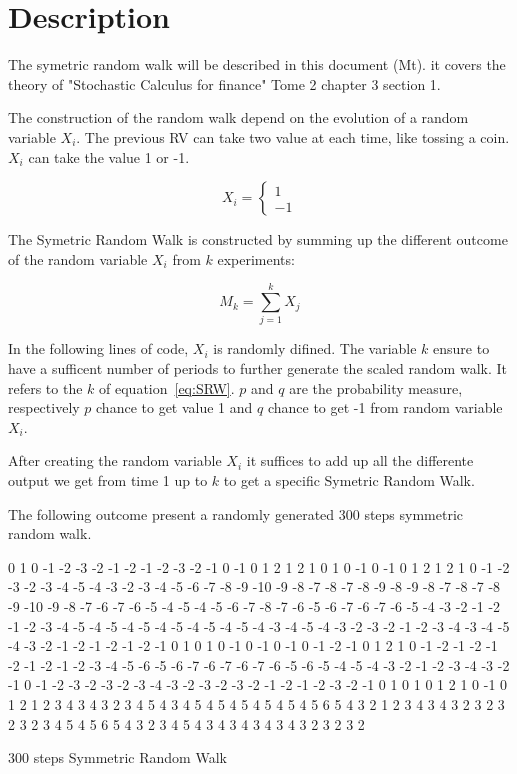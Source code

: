 \documentclass{article}
\begin{document}


\section{Description}
The symetric random walk will be described in this document (Mt). it covers the theory of "Stochastic Calculus for finance" Tome 2 chapter 3 section 1.

The construction of the random walk depend on the evolution of a random variable $X_i$. The previous RV can take two value at each time, like tossing a coin. $X_i$ can take the value 1 or -1.

\begin{equation}
 \label{eq:Xi}
X_i = 
\left \{{
  \begin{array}{c} 1 \\ -1 \end{array}
  }\right .
\end{equation}
 
The Symetric Random Walk is constructed by summing up the different outcome of the random variable $X_i$ from $k$ experiments:

\begin{equation}
\label{eq:SRW}
M_k = 
\sum_{j=1}^k X_j
\end{equation}

In the following lines of code, $X_i$ is randomly difined. The variable $k$ ensure to have a sufficent number of periods to further generate the scaled random walk.
It refers to the $k$ of equation~\ref{eq:SRW}.
$p$ and $q$ are the probability measure, respectively $p$ chance to get value 1 and $q$ chance to get -1 from random variable $X_i$.




After creating the random variable $X_i$ it suffices to add up all the differente output we get from time 1 up to $k$ to get a specific Symetric Random Walk.

The following outcome present a randomly generated 300 steps symmetric random walk.

\begin{table}[h]
0 1 0 -1 -2 -3 -2 -1 -2 -1 -2 -3 -2 -1 0 -1 0 1 2 1 2 1 0 1 0 -1 0 -1 0 1 2 1 2 1 0 -1 -2 -3 -2 -3 -4 -5 -4 -3 -2 -3 -4 -5 -6 -7 -8 -9 -10 -9 -8 -7 -8 -7 -8 -9 -8 -9 -8 -7 -8 -7 -8 -9 -10 -9 -8 -7 -6 -7 -6 -5 -4 -5 -4 -5 -6 -7 -8 -7 -6 -5 -6 -7 -6 -7 -6 -5 -4 -3 -2 -1 -2 -1 -2 -3 -4 -5 -4 -5 -4 -5 -4 -5 -4 -5 -4 -5 -4 -3 -4 -5 -4 -3 -2 -3 -2 -1 -2 -3 -4 -3 -4 -5 -4 -3 -2 -1 -2 -1 -2 -1 -2 -1 0 1 0 1 0 -1 0 -1 0 -1 0 -1 -2 -1 0 1 2 1 0 -1 -2 -1 -2 -1 -2 -1 -2 -1 -2 -3 -4 -5 -6 -5 -6 -7 -6 -7 -6 -7 -6 -5 -6 -5 -4 -5 -4 -3 -2 -1 -2 -3 -4 -3 -2 -1 0 -1 -2 -3 -2 -3 -2 -3 -4 -3 -2 -3 -2 -3 -2 -1 -2 -1 -2 -3 -2 -1 0 1 0 1 0 1 2 1 0 -1 0 1 2 1 2 3 4 3 4 3 2 3 4 5 4 3 4 5 4 5 4 5 4 5 4 5 4 5 6 5 4 3 2 1 2 3 4 3 4 3 2 3 2 3 2 3 2 3 4 5 4 5 6 5 4 3 2 3 4 5 4 3 4 3 4 3 4 3 4 3 2 3 2 3 2\caption{300 steps Symmetric Random Walk}
\end{table}
\end{document}
